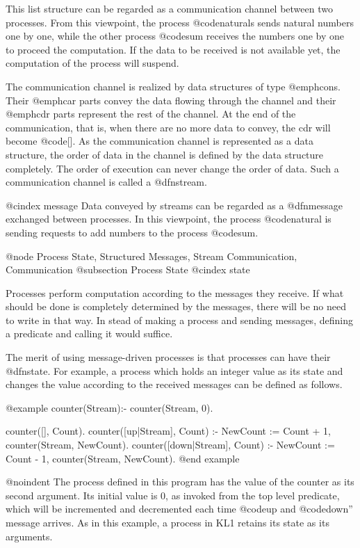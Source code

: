 {This list structure can be regarded as a communication channel between
two processes.  From this viewpoint, the process @code{naturals} sends
natural numbers one by one, while the other process @code{sum} receives
the numbers one by one to proceed the computation.  If the data to be
received is not available yet, the computation of the process will
suspend.

The communication channel is realized by data structures of type
@emph{cons}.  Their @emph{car} parts convey the data flowing through the
channel and their @emph{cdr} parts represent the rest of the channel.
At the end of the communication, that is, when there are no more data to
convey, the cdr will become @code{[]}.  As the communication channel is
represented as a data structure, the order of data in the channel is
defined by the data structure completely.  The order of execution can
never change the order of data.  Such a communication channel is called
a @dfn{stream}.

@cindex message
Data conveyed by streams can be regarded as a @dfn{message} exchanged
between processes.  In this viewpoint, the process @code{natural} is
sending requests to add numbers to the process @code{sum}.

@node Process State, Structured Messages, Stream Communication, Communication
@subsection Process State
@cindex state

Processes perform computation according to the messages they receive.
If what should be done is completely determined by the messages, there
will be no need to write in that way.  In stead of making a process and
sending messages, defining a predicate and calling it would suffice.

The merit of using message-driven processes is that processes can have
their @dfn{state}.  For example, a process which holds an integer value
as its state and changes the value according to the received messages
can be defined as follows.

@example
counter(Stream):- counter(Stream, 0).

counter([], Count).
counter([up|Stream], Count) :-
    NewCount := Count + 1,
    counter(Stream, NewCount).
counter([down|Stream], Count) :-
    NewCount := Count - 1,
    counter(Stream, NewCount).
@end example

@noindent
The process defined in this program has the value of the counter as its
second argument.  Its initial value is 0, as invoked from the top level
predicate, which will be incremented and decremented each time @code{up}
and @code{down}'' message arrives.  As in this example, a process in KL1
retains its state as its arguments.

}
